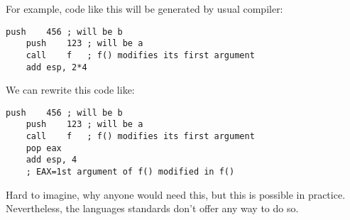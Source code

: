For example, code like this will be generated by usual \CCpp compiler:

\begin{lstlisting}[style=customasmx86]
	push	456	; will be b
	push	123	; will be a
	call	f	; f() modifies its first argument
	add	esp, 2*4
\end{lstlisting}

We can rewrite this code like:

\begin{lstlisting}[style=customasmx86]
	push	456	; will be b
	push	123	; will be a
	call	f	; f() modifies its first argument
	pop	eax
	add	esp, 4
	; EAX=1st argument of f() modified in f()
\end{lstlisting}

Hard to imagine, why anyone would need this, but this is possible in practice.
Nevertheless, the \CCpp languages standards don't offer any way to do so.



